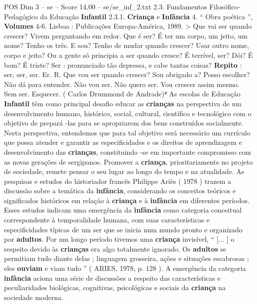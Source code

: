 \begin{textsample}{POS Dim 3 – se – Score 14.00 – se/se\_inf\_2.txt}  \label{ex:f3_pos_164}
2.3.
Fundamentos Filosófico-Pedagógico da Educação \textbf{Infantil} 2.3.1. \textbf{Criança} e \textbf{Infância} 4. “ Obra poética ”, \textbf{Volumes} 4-6.
Lisboa : Publicações Europa-América, 1989. > Que vai ser quando crescer?
Vivem perguntando em redor.
Que é ser?
É ter um corpo, um jeito, um nome?
Tenho os três.
E sou?
Tenho de mudar quando crescer?
Usar outro nome, corpo e jeito?
Ou a gente só principia a ser quando cresce?
É terrível, ser?
Dói?
É bom?
É triste?
Ser : pronunciado tão depressa, e cabe tantas coisas? \textbf{Repito} : ser, ser, ser.
Er.
R.
Que vou ser quando crescer?
Sou obrigado a?
Posso escolher?
Não dá para entender.
Não vou ser.
Não quero ser.
Vou crescer assim mesmo.
Sem ser.
Esquecer. ( Carlos Drummond de Andrade)⁴ As escolas de Educação \textbf{Infantil} têm como principal desafio educar as \textbf{crianças} na perspectiva de um desenvolvimento humano, histórico, social, cultural, científico e tecnológico com o objetivo de prepará -las para se apropriarem dos bens construídos socialmente.
Nesta perspectiva, entendemos que para tal objetivo será necessário um currículo que possa atender e garantir as especificidades e os direitos de aprendizagem e desenvolvimento das \textbf{crianças}, constituindo -se em importante compromisso com as novas gerações de sergipanos.
Promover a \textbf{criança}, prioritariamente no projeto de sociedade, remete pensar o seu lugar ao longo do tempo e na atualidade.
As pesquisas e estudos do historiador francês Philippe Ariès ( 1978 ) trazem a discussão sobre a temática da \textbf{infância}, considerando os conceitos teóricos e significados históricos em relação à \textbf{criança} e à \textbf{infância} em diferentes períodos.
Esses estudos indicam uma emergência da \textbf{infância} como categoria conceitual correspondente à temporalidade humana, com suas características e especificidades típicas de um ser que se inicia num mundo pronto e organizado por \textbf{adultos}.
Por um longo período tivemos uma \textbf{criança} invisível, “ [... ] o respeito devido às \textbf{crianças} era algo totalmente ignorado.
Os \textbf{adultos} se permitiam tudo diante delas ; linguagem grosseira, ações e situações escabrosas ; eles \textbf{ouviam} e viam tudo ” ( ARIES, 1978, p. 128 ).
A emergência da categoria \textbf{infância} aciona uma série de discussões a respeito das características e peculiaridades biológicas, cognitivas, psicológicas e sociais da \textbf{criança} na sociedade moderna.

\end{textsample}
